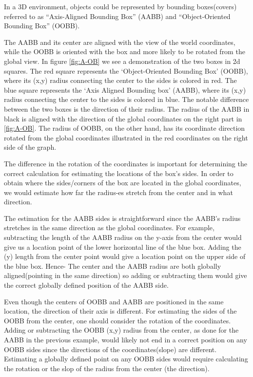 In a 3D environment, objects could be represented by bounding boxes(covers) referred to as “Axis-Aligned Bounding Box” (AABB) and “Object-Oriented Bounding Box” (OOBB).

The AABB and its center are aligned with the view of the world coordinates, while the OOBB is oriented with the box and more likely to be rotated from the global view. In figure \ref{fig:A-OB} we see a demonstration of the two boxes in 2d squares. The red square represents the ‘Object-Oriented Bounding Box’ (OOBB), where its (x,y) radius connecting the center to the sides is colored in red. The blue square represents the ‘Axis Aligned Bounding box’ (AABB), where its (x,y) radius connecting the center to the sides is colored in blue. The notable difference between the two boxes is the direction of their radius. The radius of the AABB in black is aligned with the direction of the global coordinates on the right part in \ref{fig:A-OB}. The radius of OOBB, on the other hand, has its coordinate direction rotated from the global coordinates illustrated in the red coordinates on the right side of the graph. 

The difference in the rotation of the coordinates is important for determining the correct calculation for estimating the locations of the box’s sides. In order to obtain where the sides/corners of the box are located in the global coordinates, we would estimate how far the radius-es stretch from the center and in what direction.

The estimation for the AABB sides is straightforward since the AABB’s radius stretches in the same direction as the global coordinates. For example, subtracting the length of the AABB radius on the y-axis from the center would give us a location point of the lower horizontal line of the blue box. Adding the (y) length from the center point would give a location point on the upper side of the blue box. Hence- The center and the AABB radius are both globally aligned(pointing in the same direction) so adding or subtracting them would give the correct globally defined position of the AABB side.

Even though the centers of OOBB and AABB are positioned in the same location, the direction of their axis is different. For estimating the sides of the OOBB from the center, one should consider the rotation of the coordinates. Adding or subtracting the OOBB (x,y) radius from the center, as done for the AABB in the previous example, would likely not end in a correct position on any OOBB sides since the directions of the coordinates(slope) are different. Estimating a globally defined point on any OOBB sides would require calculating the rotation or the slop of the radius from the center (the direction). 

